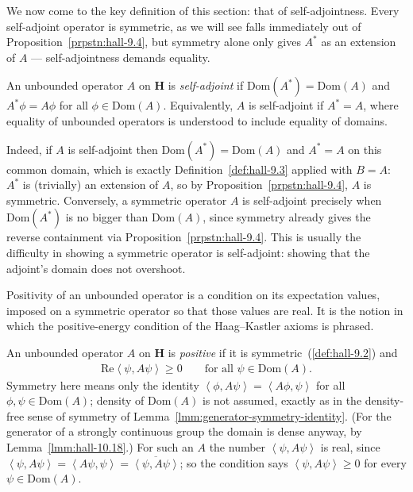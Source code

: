 We now come to the key definition of this section: that of self-adjointness. Every self-adjoint operator is symmetric, as we will see falls immediately out of Proposition~\ref{prpstn:hall-9.4}, but symmetry alone only gives $A^*$ as an extension of $A$ — self-adjointness demands equality.

\begin{definition}
    \label{def:hall-9.5}
    \leanok
    An unbounded operator $A$ on $\mathbf{H}$ is \textit{self-adjoint} if $\text{Dom}(A^*) = \text{Dom}(A)$ and $A^*\phi = A\phi$ for all $\phi \in \text{Dom}(A)$. Equivalently, $A$ is self-adjoint if $A^* = A$, where equality of unbounded operators is understood to include equality of domains.
\end{definition}

Indeed, if $A$ is self-adjoint then $\text{Dom}(A^*) = \text{Dom}(A)$ and $A^* = A$ on this common domain, which is exactly Definition~\ref{def:hall-9.3} applied with $B = A$: $A^*$ is (trivially) an extension of $A$, so by Proposition~\ref{prpstn:hall-9.4}, $A$ is symmetric. Conversely, a symmetric operator $A$ is self-adjoint precisely when $\text{Dom}(A^*)$ is no bigger than $\text{Dom}(A)$, since symmetry already gives the reverse containment via Proposition~\ref{prpstn:hall-9.4}. This is usually the difficulty in showing a symmetric operator is self-adjoint: showing that the adjoint's domain does not overshoot.

Positivity of an unbounded operator is a condition on its expectation values, imposed on a symmetric operator so that those values are real. It is the notion in which the positive-energy condition of the Haag–Kastler axioms is phrased.

\begin{definition}
    \label{def:positive-unbounded-operator}
    \leanok
    An unbounded operator $A$ on $\mathbf{H}$ is \textit{positive} if it is symmetric~(\ref{def:hall-9.2}) and
    \begin{align}
        \text{Re}\left< \psi, A\psi \right> \ge 0 \qquad \text{for all } \psi \in \text{Dom}(A).
    \end{align}
    Symmetry here means only the identity $\left< \phi, A\psi \right> = \left< A\phi, \psi \right>$ for all $\phi, \psi \in \text{Dom}(A)$; density of $\text{Dom}(A)$ is not assumed, exactly as in the density-free sense of symmetry of Lemma~\ref{lmm:generator-symmetry-identity}. (For the generator of a strongly continuous group the domain is dense anyway, by Lemma~\ref{lmm:hall-10.18}.) For such an $A$ the number $\left< \psi, A\psi \right>$ is real, since $\left< \psi, A\psi \right> = \left< A\psi, \psi \right> = \overline{\left< \psi, A\psi \right>}$; so the condition says $\left< \psi, A\psi \right> \ge 0$ for every $\psi \in \text{Dom}(A)$.
\end{definition}

